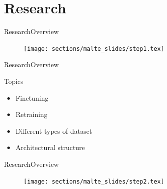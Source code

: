 \section{Research}
\begin{frame}{Research}{Overview}
        \begin{figure}
            \centering
            \texttt{[image: sections/malte\_slides/step1.tex]}
        \end{figure}
\end{frame}

\begin{frame}{Research}{Overview}
    \begin{block}{Topics}
        \begin{itemize}
            \item Finetuning
            \item Retraining
            \item Different types of dataset
            \item Architectural structure
        \end{itemize}
    \end{block}
\end{frame}

\begin{frame}{Research}{Overview}
    \begin{figure}
        \centering
        \texttt{[image: sections/malte\_slides/step2.tex]}
    \end{figure}
\end{frame}

